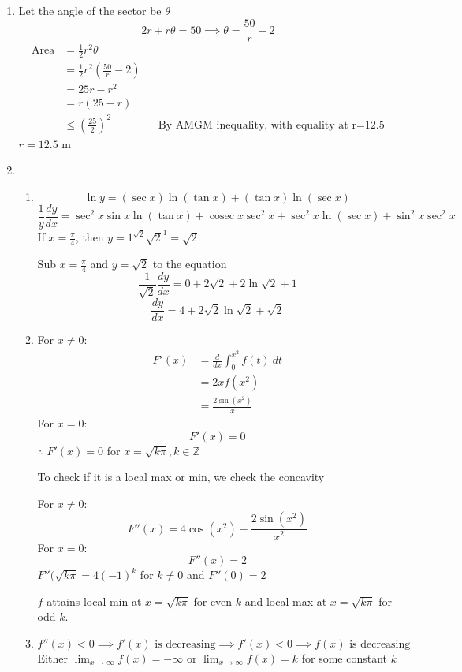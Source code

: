 \documentclass[12pt]{article}
\DeclareMathOperator{\cosec}{cosec}
\theoremstyle{definition}
\begin{document}
\begin{enumerate}
  \item Let the angle of the sector be $\theta$
        \[2r+r\theta=50 \implies \theta = \frac{50}{r} -2\]
        \begin{align*}
          \text{Area} &= \frac{1}{2}r^2\theta \\
            &= \frac{1}{2}r^2\left(\frac{50}{r}-2\right) \\
            &= 25r - r^2 \\
            &= r(25-r) \\
            &\leq \left(\frac{25}{2}\right)^2 && \text{By AMGM inequality, with equality at r=12.5}
        \end{align*}
        $r=12.5$ m
  \item \begin{enumerate}[label=(\alph*)]
          \item \[\ln y = (\sec x)\ln(\tan x) + (\tan x)\ln(\sec x)\]
                \[\frac{1}{y}\frac{dy}{dx} = \sec^2 x\sin x \ln(\tan x) + \cosec x \sec^2 x + \sec^2 x \ln (\sec x) + \sin^2 x\sec^2 x\]
                If $x=\frac{\pi}{4}$, then $y=1^{\sqrt{2}}\sqrt{2}^1=\sqrt{2}$
                
                Sub $x=\frac{\pi}{4}$ and $y=\sqrt{2}$ to the equation
                \[\frac{1}{\sqrt{2}}\frac{dy}{dx} = 0 + 2\sqrt{2} + 2\ln\sqrt{2} +1\]
                \[\frac{dy}{dx} = 4+2\sqrt{2}\ln\sqrt{2}+\sqrt{2}\]
          \item For $x\neq 0$:
                \begin{align*}
                  F'(x) &= \frac{d}{dx}\int_0^{x^2}f(t)\ dt \\
                    &= 2xf(x^2) \\
                    &= \frac{2\sin(x^2)}{x} 
                \end{align*}
                For $x = 0$:
                \[F'(x) = 0\]
                $\therefore$ $F'(x)=0$ for $x=\sqrt{k\pi},k\in \mathbb{Z}$
                
                To check if it is a local max or min, we check the concavity
                
                For $x\neq 0$:
                \[F''(x) = 4\cos(x^2)-\frac{2\sin(x^2)}{x^2}\]
                For $x=0$:
                \[F''(x) = 2\]
                $F''(\sqrt{k\pi} = 4(-1)^k$ for $k\neq 0$ and $F''(0) = 2$
                
                $f$ attains local min at $x=\sqrt{k\pi}$ for even $k$ and local max at $x=\sqrt{k\pi}$ for odd $k$.
          \item \[f''(x)<0 \implies f'(x)\text{ is decreasing} \implies f'(x)<0 \implies f(x)\text{ is decreasing}\]
                Either $\lim_{x\to \infty}f(x)=-\infty$ or $\lim_{x\to \infty}f(x)=k$ for some constant $k$
                

\end{enumerate}
\end{enumerate}
\end{document}
